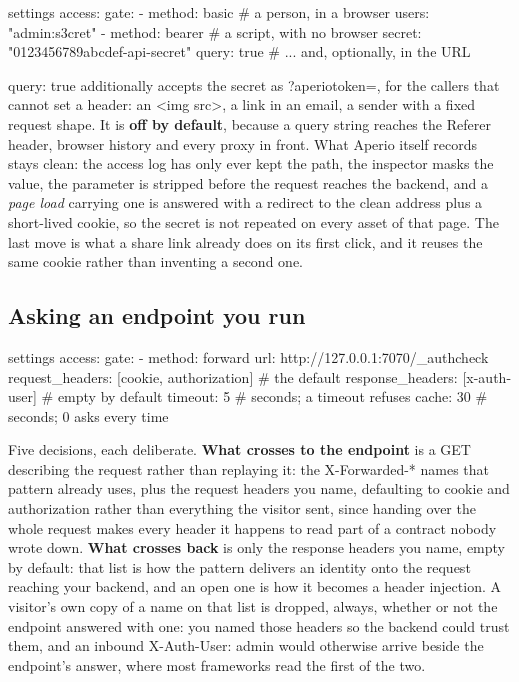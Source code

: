 \documentclass[11pt,a4paper,oneside]{book}
\newcommand{\aperiobreakableunderscore}{\textunderscore\allowbreak}
\newcommand{\aperiocodebreaks}{\XeTeXinterchartokenstate=1 }
\newcommand{\aperiocodebreaks}{}
\DeclareRobustCommand{\code}[1]{{\ttfamily\small\aperiocodebreaks
  \let\_\aperiobreakableunderscore#1}}
\begin{document}
\begin{codecard}[aperioyaml]{settings}
access:
  gate:
    - method: basic                # a person, in a browser
      users: "admin:s3cret"
    - method: bearer               # a script, with no browser
      secret: "0123456789abcdef-api-secret"
      query: true                  # ... and, optionally, in the URL
\end{codecard}

\code{query: true} additionally accepts the secret as
\code{?aperio\_token=}, for the callers that cannot set a header: an
\code{<img src>}, a link in an email, a sender with a fixed request
shape. It is \textbf{off by default}, because a query string reaches the
\code{Referer} header, browser history and every proxy in front. What
Aperio itself records stays clean: the access log has only ever kept the
path, the inspector masks the value, the parameter is stripped before the
request reaches the backend, and a \emph{page load} carrying one is
answered with a redirect to the clean address plus a short-lived cookie,
so the secret is not repeated on every asset of that page. The last move
is what a share link already does on its first click, and it reuses the
same cookie rather than inventing a second one.

\subsection{Asking an endpoint you run}

\begin{codecard}[aperioyaml]{settings}
access:
  gate:
    - method: forward
      url: http://127.0.0.1:7070/_authcheck
      request_headers: [cookie, authorization]   # the default
      response_headers: [x-auth-user]            # empty by default
      timeout: 5                                 # seconds; a timeout refuses
      cache: 30                                  # seconds; 0 asks every time
\end{codecard}

Five decisions, each deliberate. \textbf{What crosses to the endpoint} is
a \code{GET} describing the request rather than replaying it: the
\code{X-Forwarded-*} names that pattern already uses, plus the request
headers you name, defaulting to \code{cookie} and \code{authorization}
rather than everything the visitor sent, since handing over the whole
request makes every header it happens to read part of a contract nobody
wrote down. \textbf{What crosses back} is only the response headers you
name, empty by default: that list is how the pattern delivers an identity
onto the request reaching your backend, and an open one is how it becomes
a header injection. A visitor's own copy of a name on that list is
dropped, always, whether or not the endpoint answered with one: you named
those headers so the backend could trust them, and an inbound
\code{X-Auth-User: admin} would otherwise arrive beside the endpoint's
answer, where most frameworks read the first of the two.
\end{document}
